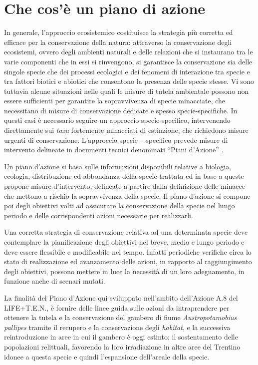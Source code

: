 \documentclass[10pt,twoside,openany,x11names,svgnames,italian,a5paper,dvipsnames,table]{memoir}
\begin{document}
\chapter{Che cos'\`e un piano di azione}
\footnotesize
\vspace{.5cm}
In generale, l'approccio ecosistemico costituisce la strategia più corretta ed efficace per la conservazione della natura: attraverso la conservazione degli ecosistemi, ovvero degli ambienti naturali e delle relazioni che si instaurano tra le varie componenti che in essi si rinvengono, si garantisce la conservazione sia delle singole specie che dei processi ecologici e dei fenomeni di interazione tra specie e tra fattori biotici e abiotici che consentono la presenza delle specie stesse.
Vi sono tuttavia alcune situazioni nelle quali le misure di tutela ambientale possono non essere sufficienti per garantire la sopravvivenza di specie minacciate, che necessitano di misure di conservazione dedicate e spesso specie-specifiche. In questi casi è necessario seguire un approccio specie-specifico, intervenendo direttamente sui \emph{taxa} fortemente minacciati di estinzione, che richiedono misure urgenti di conservazione. L’approccio specie – specifico prevede misure di intervento delineate in documenti tecnici denominati “Piani d’Azione” \cite{EUCOUNCIL98}.

Un piano d’azione si basa sulle informazioni disponibili relative a biologia, ecologia, distribuzione ed abbondanza della specie trattata ed in base a queste propone misure d’intervento, delineate a partire dalla definizione delle minacce che mettono a rischio la sopravvivenza della specie. Il piano d’azione si compone poi degli obiettivi volti ad assicurare la conservazione della specie nel lungo periodo e delle corrispondenti azioni necessarie per realizzarli.

Una corretta strategia di conservazione relativa ad una determinata specie deve contemplare la pianificazione degli obiettivi nel breve, medio e lungo periodo e deve essere flessibile e modificabile nel tempo. Infatti periodiche verifiche circa lo stato di realizzazione ed avanzamento delle azioni, in rapporto al raggiungimento degli obiettivi, possono mettere in luce la necessità di un loro adeguamento, in funzione anche di scenari mutati.

La finalità del Piano d'Azione qui sviluppato nell’ambito dell'Azione A.8 del LIFE+T.E.N., è fornire delle linee guida sulle azioni da intraprendere per ottenere la tutela e la conservazione del gambero di fiume \emph{Austropotamobius pallipes} tramite il recupero e la conservazione degli \emph{habitat}, e la successiva reintroduzione in aree in cui il gambero è oggi estinto; il sostentamento delle popolazioni relittuali, favorendo la loro irradiazione in altre aree del Trentino idonee a questa specie e quindi l’espansione dell’areale della specie. \\
\end{document}
